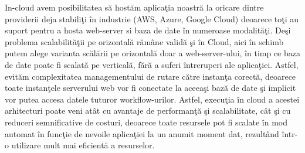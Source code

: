 \par In-cloud avem posibilitatea să hostăm aplicaţia noastră la oricare dintre providerii deja stabiliţi în industrie (AWS, Azure, Google Cloud) deoarece toţi au suport pentru a hosta web-server si baza de date în numeroase modalităţi. Deşi problema scalabilităţii pe orizontală rămâne validă şi în Cloud, aici în schimb putem alege varianta scălării pe orizontală doar a web-server-ului, în timp ce baza de date poate fi scalată pe verticală, fără a suferi întreruperi ale aplicaţiei. Astfel, evităm complexitatea managementului de rutare către instanţa corectă, deoarece toate instanţele serverului web vor fi conectate la aceeaşi bază de date şi implicit vor putea accesa datele tuturor workflow-urilor. Astfel, execuţia în cloud a acestei arhitecturi poate veni atât cu avantaje de performanţă şi scalabilitate, cât şi cu reduceri semnificative de costuri, deoarece toate resursele pot fi scalate în mod automat în funcţie de nevoile aplicaţiei la un anumit moment dat, rezultând într-o utilizare mult mai eficientă a resurselor. 
